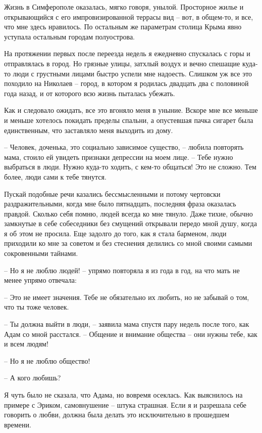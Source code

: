 \documentclass[
]{book}
\begin{document}
Жизнь в Симферополе оказалась, мягко говоря, унылой. Просторное жилье и открывающийся с его импровизированной террасы вид -- вот, в общем-то, и все, что мне здесь нравилось. По остальным же параметрам столица Крыма явно уступала остальным городам полуострова.

На протяжении первых после переезда недель я ежедневно спускалась с горы и отправлялась в город. Но грязные улицы, затхлый воздух и вечно спешащие куда-то люди с грустными лицами быстро успели мне надоесть. Слишком уж все это походило на Николаев -- город, в котором я родилась двадцать два с половиной года назад, и от которого всю жизнь пыталась убежать.

Как и следовало ожидать, все это вгоняло меня в уныние. Вскоре мне все меньше и меньше хотелось покидать пределы спальни, а опустевшая пачка сигарет была единственным, что заставляло меня выходить из дому.

-- Человек, доченька, это социально зависимое существо, -- любила повторять мама, стоило ей увидеть признаки депрессии на моем лице. -- Тебе нужно выбраться в люди. Нужно куда-то ходить, с кем-то общаться! Это не сложно. Тем более, люди сами к тебе тянутся.

Пускай подобные речи казались бессмысленными и потому чертовски раздражительными, когда мне было пятнадцать, последняя фраза оказалась правдой. Сколько себя помню, людей всегда ко мне тянуло. Даже тихие, обычно замкнутые в себе собеседники без смущений открывали передо мной душу, когда я об этом не просила. Еще задолго до того, как я стала барменом, люди приходили ко мне за советом и без стеснения делились со мной своими самыми сокровенными тайнами.

-- Но я не люблю людей! -- упрямо повторяла я из года в год, на что мать не менее упрямо отвечала:

-- Это не имеет значения. Тебе не обязательно их любить, но не забывай о том, что ты тоже человек.

-- Ты должна выйти в люди, -- заявила мама спустя пару недель после того, как Адам со мной расстался. -- Общение и внимание общества -- они нужны тебе, как и всем людям!

-- Но я не люблю общество!

-- А кого любишь?

Я чуть было не сказала, что Адама, но вовремя осеклась. Как выяснилось на примере с Эриком, самовнушение -- штука страшная. Если я и разрешала себе говорить о любви, должна была делать это исключительно в прошедшем времени.
\end{document}
